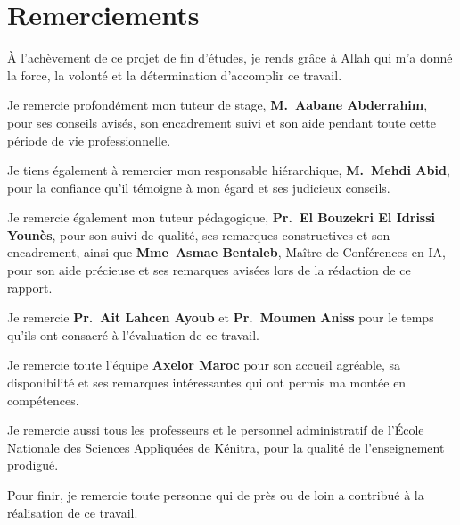 \chapter*{Remerciements}

À l'achèvement de ce projet de fin d'études, je rends grâce à Allah qui m'a donné la force, la volonté et la détermination d'accomplir ce travail.

Je remercie profondément mon tuteur de stage, \textbf{M.~Aabane Abderrahim}, pour ses conseils avisés, son encadrement suivi et son aide pendant toute cette période de vie professionnelle.

Je tiens également à remercier mon responsable hiérarchique, \textbf{M.~Mehdi Abid}, pour la confiance qu'il témoigne à mon égard et ses judicieux conseils.

Je remercie également mon tuteur pédagogique, \textbf{Pr.~El Bouzekri El Idrissi Younès}, pour son suivi de qualité, ses remarques constructives et son encadrement, ainsi que \textbf{Mme~Asmae Bentaleb}, Maître de Conférences en IA, pour son aide précieuse et ses remarques avisées lors de la rédaction de ce rapport.

Je remercie \textbf{Pr.~Ait Lahcen Ayoub} et \textbf{Pr.~Moumen Aniss} pour le temps qu'ils ont consacré à l'évaluation de ce travail.

Je remercie toute l'équipe \textbf{Axelor Maroc} pour son accueil agréable, sa disponibilité et ses remarques intéressantes qui ont permis ma montée en compétences.

Je remercie aussi tous les professeurs et le personnel administratif de l'École Nationale des Sciences Appliquées de Kénitra, pour la qualité de l'enseignement prodigué.

Pour finir, je remercie toute personne qui de près ou de loin a contribué à la réalisation de ce travail.
